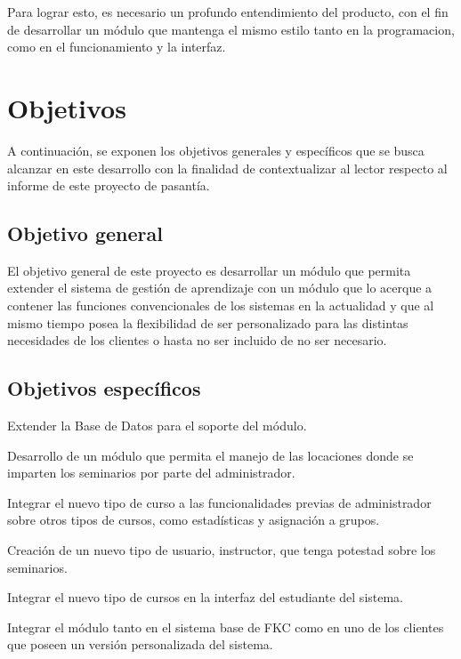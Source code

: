 Para lograr esto, es necesario un profundo entendimiento del producto, con el fin de desarrollar un módulo que mantenga el mismo estilo tanto en la programacion, como en el funcionamiento y la interfaz. 


\section*{Objetivos}
A continuación, se exponen los objetivos generales y específicos que se busca alcanzar en este desarrollo con la finalidad de contextualizar al lector respecto al informe de este proyecto de pasantía.

\subsection*{Objetivo general}
El objetivo general de este proyecto es desarrollar un módulo que permita extender el sistema de gestión de aprendizaje con un módulo que lo acerque a contener las funciones convencionales de los sistemas en la actualidad y que al mismo tiempo posea la flexibilidad de ser personalizado para las distintas necesidades de los clientes o hasta no ser incluido de no ser necesario.

\subsection*{Objetivos específicos}
Extender la Base de Datos para el soporte del módulo.

Desarrollo de un módulo que permita el manejo de las locaciones donde se imparten los seminarios por parte del administrador.

Integrar el nuevo tipo de curso a las funcionalidades previas de administrador sobre otros tipos de cursos, como estadísticas y asignación a grupos.

Creación de un nuevo tipo de usuario, instructor, que tenga potestad sobre los seminarios.

Integrar el nuevo tipo de cursos en la interfaz del estudiante del sistema.

Integrar el módulo tanto en el sistema base de FKC como en uno de los clientes que poseen un versión personalizada del sistema.








